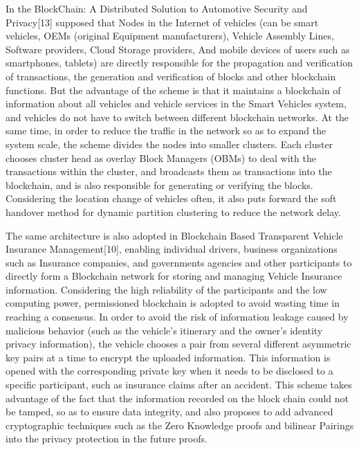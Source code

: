In the BlockChain: A Distributed Solution to Automotive Security and Privacy[13] supposed that Nodes in the Internet of vehicles (can be smart vehicles, OEMs (original Equipment manufacturers), Vehicle Assembly Lines, Software providers, Cloud Storage providers, And mobile devices of users such as smartphones, tablets) are directly responsible for the propagation and verification of transactions, the generation and verification of blocks and other blockchain functions. But the advantage of the scheme is that it maintains a blockchain of information about all vehicles and vehicle services in the Smart Vehicles system, and vehicles do not have to switch between different blockchain networks. At the same time, in order to reduce the traffic in the network so as to expand the system scale, the scheme divides the nodes into smaller clusters. Each cluster chooses cluster head as overlay Block Managers (OBMs) to deal with the transactions within the cluster, and broadcasts them as transactions into the blockchain, and is also responsible for generating or verifying the blocks. Considering the location change of vehicles often, it also puts forward the soft handover method for dynamic partition clustering to reduce the network delay. 

The same architecture is also adopted in Blockchain Based Transparent Vehicle Insurance Management[10], enabling individual drivers, business organizations such as Insurance companies, and governments agencies and other participants to directly form a Blockchain network for storing and managing Vehicle Insurance information. Considering the high reliability of the participants and the low computing power, permissioned blockchain is adopted to avoid wasting time in reaching a consensus. In order to avoid the risk of information leakage caused by malicious behavior (such as the vehicle's itinerary and the owner's identity privacy information), the vehicle chooses a pair from several different asymmetric key pairs at a time to encrypt the uploaded information. This information is opened with the corresponding private key when it needs to be disclosed to a specific participant, such as insurance claims after an accident. This scheme takes advantage of the fact that the information recorded on the block chain could not be tamped, so as to ensure data integrity, and also proposes to add advanced cryptographic techniques such as the Zero Knowledge proofs and bilinear Pairings into the privacy protection in the future proofs.



